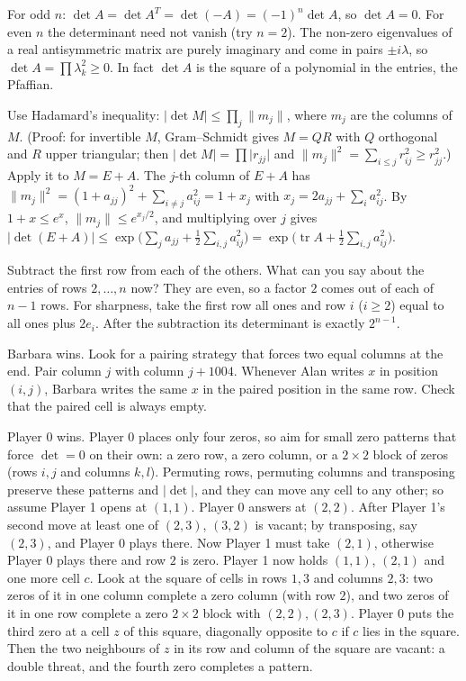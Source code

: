 \documentclass[11pt,a4paper]{article}
\begin{document}
For odd \(n\): \(\det A=\det A^T=\det(-A)=(-1)^n\det A\), so \(\det A=0\).
For even \(n\) the determinant need not vanish (try \(n=2\)). The non-zero eigenvalues of a real antisymmetric matrix are purely imaginary and come in pairs \(\pm i\lambda\), so \(\det A=\prod\lambda_k^2\ge0\). In fact \(\det A\) is the square of a polynomial in the entries, the Pfaffian.

Use Hadamard's inequality: \(\lvert\det M\rvert\le\prod_j\lVert m_j\rVert\), where \(m_j\) are the columns of \(M\). (Proof: for invertible \(M\), Gram--Schmidt gives \(M=QR\) with \(Q\) orthogonal and \(R\) upper triangular; then \(\lvert\det M\rvert=\prod\lvert r_{jj}\rvert\) and \(\lVert m_j\rVert^2=\sum_{i\le j}r_{ij}^2\ge r_{jj}^2\).) Apply it to \(M=E+A\).
The \(j\)-th column of \(E+A\) has \(\lVert m_j\rVert^2=(1+a_{jj})^2+\sum_{i\ne j}a_{ij}^2=1+x_j\) with \(x_j=2a_{jj}+\sum_ia_{ij}^2\). By \(1+x\le e^x\), \(\lVert m_j\rVert\le e^{x_j/2}\), and multiplying over \(j\) gives \(\lvert\det(E+A)\rvert\le\exp\bigl(\sum_ja_{jj}+\frac12\sum_{i,j}a_{ij}^2\bigr)=\exp\bigl(\operatorname{tr}A+\frac12\sum_{i,j}a_{ij}^2\bigr)\).

Subtract the first row from each of the others. What can you say about the entries of rows \(2,\dots,n\) now?
They are even, so a factor \(2\) comes out of each of \(n-1\) rows. For sharpness, take the first row all ones and row \(i\) (\(i\ge2\)) equal to all ones plus \(2e_i\). After the subtraction its determinant is exactly \(2^{n-1}\).

Barbara wins. Look for a pairing strategy that forces two equal columns at the end.
Pair column \(j\) with column \(j+1004\). Whenever Alan writes \(x\) in position \((i,j)\), Barbara writes the same \(x\) in the paired position in the same row. Check that the paired cell is always empty.

Player 0 wins. Player 0 places only four zeros, so aim for small zero patterns that force \(\det=0\) on their own: a zero row, a zero column, or a \(2\times2\) block of zeros (rows \(i,j\) and columns \(k,l\)). Permuting rows, permuting columns and transposing preserve these patterns and \(\lvert\det\rvert\), and they can move any cell to any other; so assume Player 1 opens at \((1,1)\).
Player 0 answers at \((2,2)\). After Player 1's second move at least one of \((2,3)\), \((3,2)\) is vacant; by transposing, say \((2,3)\), and Player 0 plays there. Now Player 1 must take \((2,1)\), otherwise Player 0 plays there and row \(2\) is zero.
Player 1 now holds \((1,1)\), \((2,1)\) and one more cell \(c\). Look at the square of cells in rows \(1,3\) and columns \(2,3\): two zeros of it in one column complete a zero column (with row \(2\)), and two zeros of it in one row complete a zero \(2\times2\) block with \((2,2),(2,3)\). Player 0 puts the third zero at a cell \(z\) of this square, diagonally opposite to \(c\) if \(c\) lies in the square. Then the two neighbours of \(z\) in its row and column of the square are vacant: a double threat, and the fourth zero completes a pattern.
\end{document}
